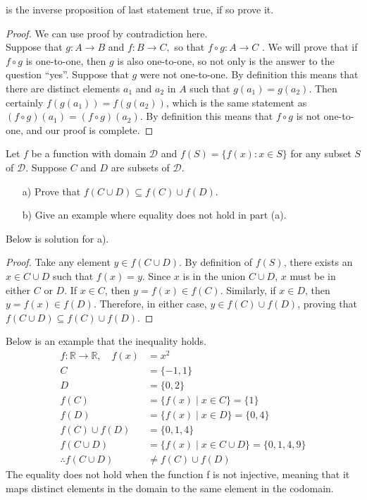 \begin{exercise}
	is the inverse proposition of last statement true, if so prove it.
\end{exercise}
\begin{proof}
	We can use proof by contradiction here.\\
	Suppose that $g: A\to B$ and $f: B\to C, $ so that $f\circ g: A\to C$ . We will prove that if 
	$f\circ g$ is one-to-one, then $g$ is also one-to-one, so not only is the answer to the question “yes”. 
	Suppose that $g$ were not one-to-one. By definition this means that there are distinct elements 
	$a_1$ and $a_2$ in $A$ such that $g( a_1) = g( a_2) .$ Then certainly $f(g(a_1))=f(g(a_2))$, which is 
	the same statement as $(f\circ g)(a_1)=(f\circ g)(a_2).$ By definition this means that $f\circ g$ is not
	one-to-one, and our proof is complete.

\end{proof}
\begin{exercise}
	Let \( f \) be a function with domain \( \mathcal{D} \) and \( f(S) = \{ f(x) : x \in S \} \) for any subset \( S \) of \( \mathcal{D} \). Suppose \( C \) and \( D \) are subsets of \( \mathcal{D} \).
\begin{enumerate}
    \item[a)] Prove that \( f(C \cup D) \subseteq f(C) \cup f(D) \).
    \item[b)] Give an example where equality does not hold in part (a).
\end{enumerate}
\end{exercise}
\begin{solution}
	Below is solution for a).
	\begin{proof}
		Take any element \( y \in f(C \cup D) \). By definition of \( f(S) \), there exists an 
		\( x \in C \cup D \) such that \( f(x) = y \). Since \( x \) is in the union \( C \cup D \), 
		\( x \) must be in either \( C \) or \( D \). If \( x \in C \), then \( y = f(x) \in f(C) \). 
		Similarly, if \( x \in D \), then \( y = f(x) \in f(D) \). Therefore, in either case, 
		\( y \in f(C) \cup f(D) \), proving that \( f(C \cup D) \subseteq f(C) \cup f(D) \).
	\end{proof}
	Below is an example that the inequality holds.
	\begin{align*}
		f: \mathbb{R} \to \mathbb{R}, \quad f(x) &= x^2 \\
		C &= \{-1, 1\} \\
		D &= \{0, 2\} \\
		f(C) &= \{f(x) \mid x \in C\} = \{1\} \\
		f(D) &= \{f(x) \mid x \in D\} = \{0, 4\} \\
		f(C) \cup f(D) &= \{0, 1, 4\} \\
		f(C \cup D) &= \{f(x) \mid x \in C \cup D\} = \{0, 1, 4, 9\} \\
		\therefore f(C \cup D) &\neq f(C) \cup f(D)
	\end{align*}
	The equality does not hold when the function f is not injective,
	meaning that it maps distinct elements in the domain to the same element in the codomain. 
\end{solution}

